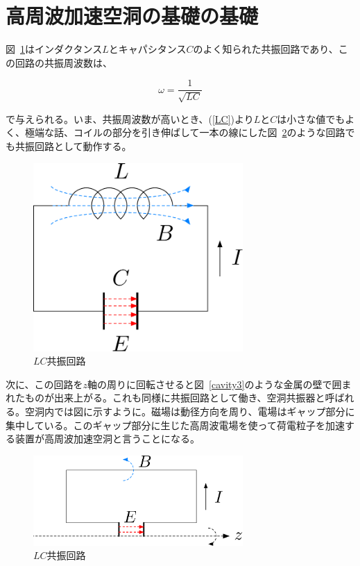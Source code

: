\documentclass[10pt,a4paper]{ltjsarticle}
\begin{document}
\section{高周波加速空洞の基礎の基礎}
図~\ref{cavity1}はインダクタンス$L$とキャパシタンス$C$のよく知られた共振回路であり、この回路の共振周波数は、

\begin{equation}
  \omega = \frac{1}{\sqrt{LC}}
  \label{LC}
\end{equation}

で与えられる。いま、共振周波数が高いとき、(\ref{LC})より$L$と$C$は小さな値でもよく、極端な話、コイルの部分を引き伸ばして一本の線にした図~\ref{cavity2}のような回路でも共振回路として動作する。

\begin{figure}[hbt]
  \begin{center}
    \includegraphics[width=8cm,clip]{figs/cavity1.pdf}
    \caption{$LC$共振回路}
   \label{cavity1}
  \end{center}
\end{figure}

次に、この回路を$z$軸の周りに回転させると図~\ref{cavity3}のような金属の壁で囲まれたものが出来上がる。これも同様に共振回路として働き、空洞共振器と呼ばれる。空洞内では図に示すように。磁場は動径方向を周り、電場はギャップ部分に集中している。このギャップ部分に生じた高周波電場を使って荷電粒子を加速する装置が高周波加速空洞と言うことになる。

\begin{figure}[hbt]
  \begin{center}
    \includegraphics[width=8cm,clip]{figs/cavity2.pdf}
    \caption{$LC$共振回路}
   \label{cavity2}
  \end{center}
\end{figure}
\end{document}
